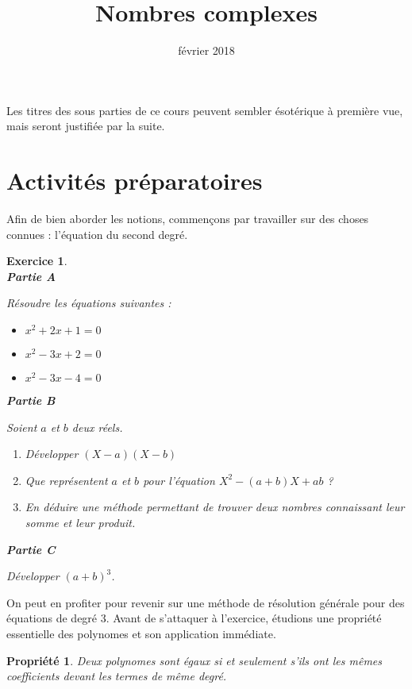 \documentclass[11pt,a4paper,french]{article}
\title{Nombres complexes}
\author{\bsc{Jumel}}
\date{février 2018}
\makeatletter
\renewcommand{\maketitle}%
{\framebox{%
    \begin{minipage}{1.0\linewidth}%
      \begin{center}%
        \Large \@title ~-- \@author \\%
        \@date%
      \end{center}%
    \end{minipage}}%
  \normalsize%
}
\theoremstyle{break}
\newtheorem{propriete}{Propriété}
\theoremstyle{plain}
\newtheorem{exerciceT}{Exercice}
\theoremstyle{nonumberplain}
\theoremstyle{nonumberbreak}
\newenvironment{exercice}{\begin{framed}\begin{exerciceT}}{\end{exerciceT}\end{framed}}
\makeatother
\begin{document}
\noindent\maketitle

\bigskip

Les titres des sous parties de ce cours peuvent sembler ésotérique à
première vue, mais seront justifiée par la suite.

\section*{Activités préparatoires}

Afin de bien aborder les notions, commençons par travailler sur des
choses connues : l'équation du second degré.

\begin{exercice}~\\
  \textbf{Partie A}

  Résoudre les équations suivantes :
  \begin{itemize}
    \item $x^2 + 2x + 1 = 0$
    \item $x^2 - 3x + 2 = 0$
    \item $x^2 - 3x - 4 = 0$
  \end{itemize}

  \noindent\textbf{Partie B}

  Soient $a$ et $b$ deux réels.
  \begin{enumerate}
    \item Développer $(X - a)(X - b)$
    \item Que représentent $a$ et $b$ pour l'équation $X^2 - (a+b)X +
      ab$ ?
    \item En déduire une méthode permettant de trouver deux nombres
      connaissant leur somme et leur produit.
  \end{enumerate}

   \noindent\textbf{Partie C}

   Développer $(a+b)^3$.
\end{exercice}

On peut en profiter pour revenir sur une méthode de résolution générale
pour des équations de degré 3. Avant de s'attaquer à l'exercice,
étudions une propriété essentielle des polynomes et son application
immédiate.

\begin{propriete}
  Deux polynomes sont égaux si et seulement s'ils ont les mêmes
  coefficients devant les termes de même degré.
\end{propriete}
\end{document}

